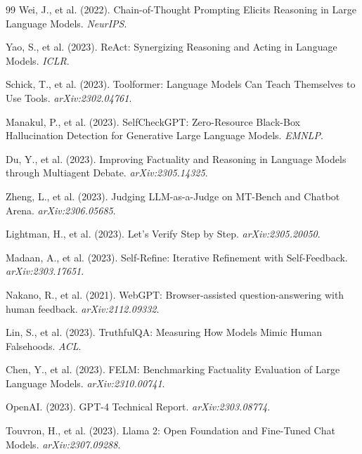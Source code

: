 \documentclass[12pt, a4paper]{report}
\begin{document}
\begin{thebibliography}{99}
         Wei, J., et al. (2022). Chain-of-Thought Prompting Elicits Reasoning in Large Language Models. \textit{NeurIPS}.

         Yao, S., et al. (2023). ReAct: Synergizing Reasoning and Acting in Language Models. \textit{ICLR}.

         Schick, T., et al. (2023). Toolformer: Language Models Can Teach Themselves to Use Tools. \textit{arXiv:2302.04761}.

         Manakul, P., et al. (2023). SelfCheckGPT: Zero-Resource Black-Box Hallucination Detection for Generative Large Language Models. \textit{EMNLP}.

         Du, Y., et al. (2023). Improving Factuality and Reasoning in Language Models through Multiagent Debate. \textit{arXiv:2305.14325}.

         Zheng, L., et al. (2023). Judging LLM-as-a-Judge on MT-Bench and Chatbot Arena. \textit{arXiv:2306.05685}.

         Lightman, H., et al. (2023). Let's Verify Step by Step. \textit{arXiv:2305.20050}.

         Madaan, A., et al. (2023). Self-Refine: Iterative Refinement with Self-Feedback. \textit{arXiv:2303.17651}.

         Nakano, R., et al. (2021). WebGPT: Browser-assisted question-answering with human feedback. \textit{arXiv:2112.09332}.

         Lin, S., et al. (2023). TruthfulQA: Measuring How Models Mimic Human Falsehoods. \textit{ACL}.

         Chen, Y., et al. (2023). FELM: Benchmarking Factuality Evaluation of Large Language Models. \textit{arXiv:2310.00741}.

         OpenAI. (2023). GPT-4 Technical Report. \textit{arXiv:2303.08774}.

         Touvron, H., et al. (2023). Llama 2: Open Foundation and Fine-Tuned Chat Models. \textit{arXiv:2307.09288}.

    \end{thebibliography}
\end{document}
